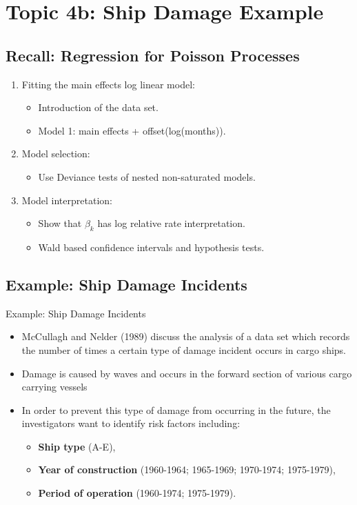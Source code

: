 \documentclass{article}\usepackage[]{graphicx}\usepackage[svgnames]{xcolor}
\newcommand{\makeheading}[2]%
{%
\begin{center}%
    \makebox[\linewidth]{\raisebox{-.5ex}[0cm][0cm]{\stackanchor{\textcolor{Gray}{\textsc{#1}}}{\scriptsize\itshape\printyearoff#2}\;}\color{Crimson!50}\hrulefill}%
\end{center}%
}%
\begin{document}
\makeheading{Week 8}{\daterange{2021-10-25}{2021-10-29}}
\section*{Topic 4b: Ship Damage Example}
\subsection*{Recall: Regression for Poisson Processes}
\begin{enumerate}[1.]
    \item Fitting the main effects log linear model:
          \begin{itemize}
              \item Introduction of the data set.
              \item Model 1: main effects + offset(log(months)).
          \end{itemize}
    \item Model selection:
          \begin{itemize}
              \item Use Deviance tests of nested non-saturated models.
          \end{itemize}
    \item Model interpretation:
          \begin{itemize}
              \item Show that $ \beta_k $ has log relative rate interpretation.
              \item Wald based confidence intervals and hypothesis tests.
          \end{itemize}
\end{enumerate}
\subsection*{Example: Ship Damage Incidents}
\begin{Example}{Example: Ship Damage Incidents}
    \begin{itemize}
        \item McCullagh and Nelder (1989) discuss the analysis of a data set which records the
              number of times a certain type of damage incident occurs in cargo ships.
        \item Damage is caused by waves and occurs in the forward section of various cargo
              carrying vessels
        \item In order to prevent this type of damage from occurring in the future, the
              investigators want to identify risk factors including:
              \begin{itemize}
                  \item \textbf{Ship type} (A-E),
                  \item \textbf{Year of construction} (1960-1964; 1965-1969; 1970-1974; 1975-1979),
                  \item \textbf{Period of operation} (1960-1974; 1975-1979).
              \end{itemize}
    \end{itemize}
\end{Example}
\end{document}
